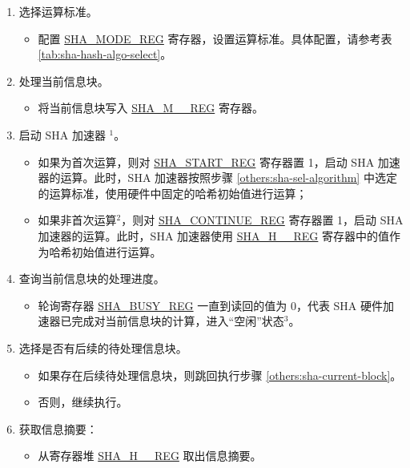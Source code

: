 \documentclass[main\_\_CN.tex]{subfiles}
\begin{document}
\begin{enumerate}
    \item \label{others:sha-sel-algorithm} 选择运算标准。
    \begin{itemize}
        \item 配置 \hyperref[regdesc:SHAMODEREG]{SHA\_MODE\_REG} 寄存器，设置运算标准。具体配置，请参考表 \ref{tab:sha-hash-algo-select}。
    \end{itemize}
    \item \label{others:sha-current-block} 处理当前信息块。
    \begin{itemize}
        \item 将当前信息块写入 \hyperref[regdesc:SHAMNREG]{SHA\_M\_\_REG} 寄存器。
    \end{itemize}
    \item 启动 SHA 加速器 \hyperref[others:sha-note-typical-sha]{$^1$}。
            \begin{itemize}
                \item 如果为首次运算，则对 \hyperref[regdesc:SHASTARTREG]{SHA\_START\_REG} 寄存器置 1，启动 SHA 加速器的运算。此时，SHA 加速器按照步骤 \ref{others:sha-sel-algorithm} 中选定的运算标准，使用硬件中固定的哈希初始值进行运算；
                \item 如果非首次运算\hyperref[others:sha-note-typical-sha]{$^2$}，则对 \hyperref[regdesc:SHACONTINUEREG]{SHA\_CONTINUE\_REG} 寄存器置 1，启动 SHA 加速器的运算。此时，SHA 加速器使用 \hyperref[regdesc:SHAHNREG]{SHA\_H\_\_REG} 寄存器中的值作为哈希初始值进行运算。
            \end{itemize}
    \item 查询当前信息块的处理进度。
    \begin{itemize}
        \item 轮询寄存器 \hyperref[regdesc:SHABUSYREG]{SHA\_BUSY\_REG} 一直到读回的值为 0，代表 SHA 硬件加速器已完成对当前信息块的计算，进入“空闲”状态\hyperref[others:sha-note-typical-sha]{$^3$}。
    \end{itemize}
        
    \item 选择是否有后续的待处理信息块。
    \begin{itemize}
        \item 如果存在后续待处理信息块，则跳回执行步骤 \ref{others:sha-current-block}。
        \item 否则，继续执行。
    \end{itemize}
    \item 获取信息摘要：
    \begin{itemize}
        \item 从寄存器堆 \hyperref[regdesc:SHAHNREG]{SHA\_H\_\_REG} 取出信息摘要。
    \end{itemize}
\end{enumerate}
\end{document}
